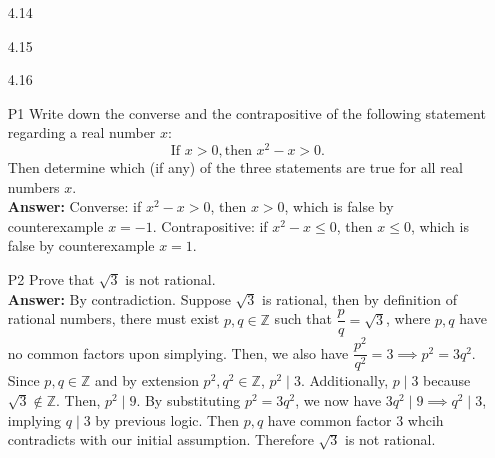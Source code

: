 \documentclass{article}
\begin{document}
\begin{itemize}
      \item [4.14]
      \item [4.15]
      \item [4.16]
      \item [P1] Write down the converse and the contrapositive of the following statement regarding a real number $x$: \[\text{If } x>0, \text{then } x^2-x>0.\] Then determine which (if any) of the three statements are true for all real numbers $x$.\\
            \textbf{Answer: } Converse: if $x^2-x>0$, then $x>0$, which is false by counterexample $x=-1$. Contrapositive: if $x^2-x\leq0$, then $x\leq0$, which is false by counterexample $x=1$.
      \item [P2] Prove that $\sqrt{3}$ is not rational.\\
            \textbf{Answer: } By contradiction. Suppose $\sqrt{3}$ is rational, then by definition of rational numbers, there must exist $p,q\in\mathbb{Z}$ such that $\dfrac{p}{q}=\sqrt{3}$, where $p,q$ have no common factors upon simplying. Then, we also have $\dfrac{p^2}{q^2}=3\implies p^2=3q^2$. Since $p,q\in\mathbb{Z}$ and by extension $p^2,q^2\in\mathbb{Z}$, $p^2\mid 3$. Additionally, $p\mid 3$ because $\sqrt{3}\notin\mathbb{Z}$. Then, $p^2\mid 9$. By substituting $p^2=3q^2$, we now have $3q^2\mid 9\implies q^2\mid 3$, implying $q\mid 3$ by previous logic. Then $p,q$ have common factor $3$ whcih contradicts with our initial assumption. Therefore $\sqrt{3}$ is not rational.
\end{itemize}
\end{document}
